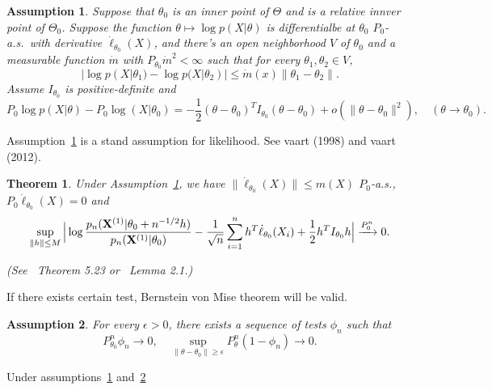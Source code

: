 \documentclass[3p]{elsarticle}
\theoremstyle{plain}
\newtheorem{theorem}{\quad\quad Theorem}
\newtheorem{assumption}{\quad\quad Assumption}
\theoremstyle{definition}
\theoremstyle{remark}
\begin{document}
\begin{assumption}\label{Assumption1}
Suppose that $\theta_0$ is an inner point of $\Theta$ and is a relative innver point of $\Theta_0$.
Suppose the function $\theta \mapsto \log p(X|\theta)$ is differentialbe at $\theta_0$  $P_0$-a.s.\ with derivative $\dot{\ell}_{\theta_0}(X)$, and there's an open neighborhood $V$ of $\theta_0$ and a measurable function $\dot{m}$ with $P_{\theta_0}\dot{m}^2<\infty$ such that for every $\theta_1,\theta_2\in V$,
        \begin{equation*}
            |\log p(X|\theta_1)-\log p(X|\theta_2)|\leq \dot{m}(x)\|\theta_1-\theta_2\|.
        \end{equation*}
    Assume $I_{\theta_0}$ is positive-definite and
    \begin{equation*}
        P_0 \log p(X|\theta)- P_0 \log (X|\theta_0)
        =-\frac{1}{2}(\theta-\theta_0)^T I_{\theta_0} (\theta-\theta_0)+o(\|\theta-\theta_0\|^2),\quad (\theta\to \theta_0).
    \end{equation*}
\end{assumption}     
Assumption~\ref{Assumption1} is a stand assumption for likelihood. See vaart (1998) and vaart (2012).
\begin{theorem}
    Under Assumption~\ref{Assumption1},
    we have $\|\dot{\ell}_{\theta_0}(X)\|\leq m(X)$ $P_0$-a.s., $P_0 \dot{\ell}_{\theta_0}(X)=0$ and
    \begin{equation*}
        \sup_{\|h\|\leq M}\Big|
         \log \frac{p_n(\mathbf{X}^{(1)}|\theta_0+n^{-1/2}h)}{p_n(\mathbf{X}^{(1)}|\theta_0)}-\frac{1}{\sqrt{n}}\sum^n_{i=1}h^T\dot{\ell}_{\theta_0}(X_i)+\frac{1}{2}h^T I_{\theta_0}h
        \Big|\xrightarrow{P^n_0}0.
    \end{equation*}

    (See~\cite{van2000asymptotic} Theorem 5.23 or~\cite{Kleijn2012The} Lemma 2.1.)
\end{theorem}
If there exists certain test, Bernstein von Mise theorem will be valid.
\begin{assumption}\label{Assumption2}
    For every $\epsilon>0$, there exists a sequence of tests $\phi_n$ such that
        \begin{equation}
            P_{\theta_0}^n\phi_n\to 0,\quad \sup_{\|\theta-\theta_0\|\geq \epsilon} P_\theta^n(1-\phi_n)\to 0.
        \end{equation}
\end{assumption}
Under assumptions~\ref{Assumption1} and~\ref{Assumption2}
        
\end{document}

